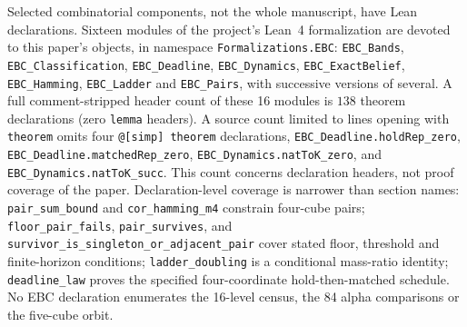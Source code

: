 \documentclass[10pt,twocolumn]{article}
\theoremstyle{plain}
\theoremstyle{definition}
\theoremstyle{remark}
\begin{document}
Selected combinatorial components, not the whole manuscript, have
Lean declarations. Sixteen modules of the project's
Lean~4 formalization are devoted to this paper's objects, in namespace
\texttt{Formalizations.EBC}: \texttt{EBC\_Bands}, \texttt{EBC\_Classification},
\texttt{EBC\_Deadline}, \texttt{EBC\_Dynamics}, \texttt{EBC\_ExactBelief},
\texttt{EBC\_Hamming}, \texttt{EBC\_Ladder} and \texttt{EBC\_Pairs}, with successive
versions of several. A full comment-stripped header count of these 16 modules is
\(138\) theorem declarations (zero \texttt{lemma} headers). A source count limited to lines opening with \texttt{theorem}
omits four \texttt{@[simp] theorem} declarations,
\texttt{EBC\_Deadline.holdRep\_zero},
\texttt{EBC\_Deadline.matchedRep\_zero},
\texttt{EBC\_Dynamics.natToK\_zero}, and
\texttt{EBC\_Dynamics.natToK\_succ}. This count concerns declaration headers, not proof coverage of the paper. Declaration-level coverage
is narrower than section names: \texttt{pair\_sum\_bound} and
\texttt{cor\_hamming\_m4} constrain four-cube pairs;
\texttt{floor\_pair\_fails}, \texttt{pair\_survives}, and
\texttt{survivor\_is\_singleton\_or\_adjacent\_pair}
cover stated floor, threshold and finite-horizon conditions;
\texttt{ladder\_doubling} is a conditional mass-ratio identity;
\texttt{deadline\_law} proves the specified four-coordinate
hold-then-matched schedule. No EBC declaration enumerates the
16-level census, the 84 alpha comparisons or the five-cube orbit.
\end{document}
